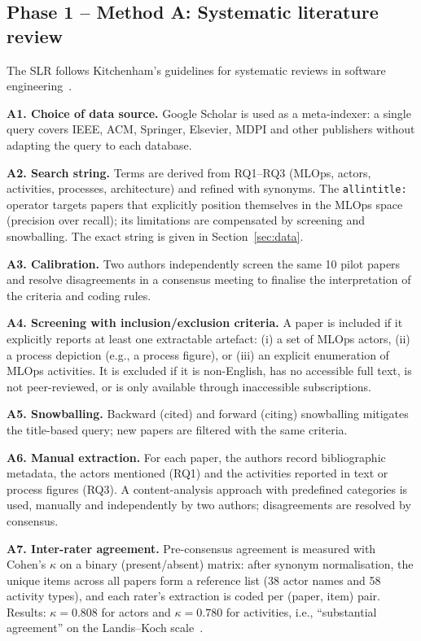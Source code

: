 \documentclass[11pt,a4paper]{article}
\begin{document}
\subsection{Phase 1 -- Method A: Systematic literature review}

The SLR follows Kitchenham's guidelines for systematic reviews in software engineering~\cite{kitchenham2007}.

\textbf{A1. Choice of data source.} Google Scholar is used as a meta-indexer: a single query covers IEEE, ACM, Springer, Elsevier, MDPI and other publishers without adapting the query to each database.

\textbf{A2. Search string.} Terms are derived from RQ1--RQ3 (MLOps, actors, activities, processes, architecture) and refined with synonyms. The \texttt{allintitle:} operator targets papers that explicitly position themselves in the MLOps space (precision over recall); its limitations are compensated by screening and snowballing. The exact string is given in Section~\ref{sec:data}.

\textbf{A3. Calibration.} Two authors independently screen the same 10 pilot papers and resolve disagreements in a consensus meeting to finalise the interpretation of the criteria and coding rules.

\textbf{A4. Screening with inclusion/exclusion criteria.} A paper is included if it explicitly reports at least one extractable artefact: (i) a set of MLOps actors, (ii) a process depiction (e.g., a process figure), or (iii) an explicit enumeration of MLOps activities. It is excluded if it is non-English, has no accessible full text, is not peer-reviewed, or is only available through inaccessible subscriptions.

\textbf{A5. Snowballing.} Backward (cited) and forward (citing) snowballing mitigates the title-based query; new papers are filtered with the same criteria.

\textbf{A6. Manual extraction.} For each paper, the authors record bibliographic metadata, the actors mentioned (RQ1) and the activities reported in text or process figures (RQ3). A content-analysis approach with predefined categories is used, manually and independently by two authors; disagreements are resolved by consensus.

\textbf{A7. Inter-rater agreement.} Pre-consensus agreement is measured with Cohen's $\kappa$ on a binary (present/absent) matrix: after synonym normalisation, the unique items across all papers form a reference list (38 actor names and 58 activity types), and each rater's extraction is coded per (paper, item) pair. Results: $\kappa = 0.808$ for actors and $\kappa = 0.780$ for activities, i.e., ``substantial agreement'' on the Landis--Koch scale~\cite{landis1977}.
\end{document}
